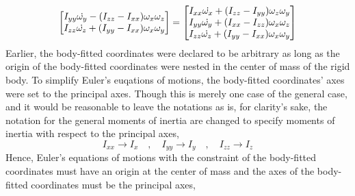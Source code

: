 \documentclass[class=report, 12pt, crop=false]{standalone}
\begin{document}
\begin{center}
$$\begin{bmatrix}
I_{yy}\dot{\omega_y} - (I_{zz} - I_{xx})\omega_x\omega_z\\
I_{zz}\dot{\omega_z} + (I_{yy} - I_{xx})\omega_x\omega_y
\end{bmatrix} = \begin{bmatrix} 
I_{xx}\dot{\omega_x} + (I_{zz} - I_{yy})\omega_z\omega_y\\
I_{yy}\dot{\omega_y} + (I_{xx} - I_{zz})\omega_x\omega_z\\
I_{zz}\dot{\omega_z} + (I_{yy} - I_{xx})\omega_x\omega_y
\end{bmatrix}$$
Earlier, the body-fitted coordinates were declared to be arbitrary as long as the origin of the body-fitted coordinates were nested in the center of mass of the rigid body. To simplify Euler's euqations of motions, the body-fitted coordinates' axes were set to the principal axes. Though this is merely one case of the general case, and it would be reasonable to leave the notations as is, for clarity's sake, the notation for the general moments of inertia are changed to specify moments of inertia with respect to the principal axes,
$$I_{xx}\to I_x \quad,\quad I_{yy}\to I_y \quad,\quad I_{zz}\to I_z$$
Hence, Euler's equations of motions with the constraint of the body-fitted coordinates must have an origin at the center of mass and the axes of the body-fitted coordinates must be the principal axes,
\\~\\



\end{center}
\end{document}
